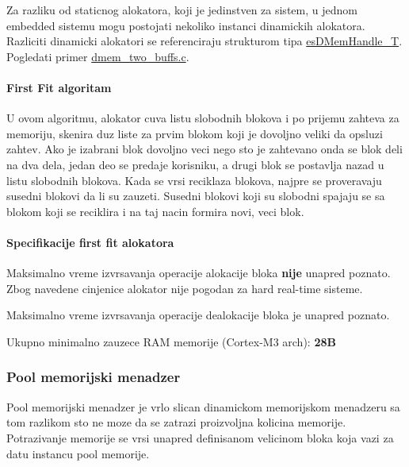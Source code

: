 Za razliku od staticnog alokatora, koji je jedinstven za sistem, u jednom embedded sistemu mogu postojati nekoliko instanci dinamickih alokatora. Razliciti dinamicki alokatori se referenciraju strukturom tipa \hyperlink{group__mem__intf_gacaaf771b18b3da8fa3b67a466390080e}{es\-D\-Mem\-Handle\-\_\-\-T}. Pogledati primer \hyperlink{dmem_two_buffs_8c-example}{dmem\-\_\-two\-\_\-buffs.\-c}.\hypertarget{group__mem_mem_ff_alloc}{}\paragraph{First Fit algoritam}\label{group__mem_mem_ff_alloc}
U ovom algoritmu, alokator cuva listu slobodnih blokova i po prijemu zahteva za memoriju, skenira duz liste za prvim blokom koji je dovoljno veliki da opsluzi zahtev. Ako je izabrani blok dovoljno veci nego sto je zahtevano onda se blok deli na dva dela, jedan deo se predaje korisniku, a drugi blok se postavlja nazad u listu slobodnih blokova. Kada se vrsi reciklaza blokova, najpre se proveravaju susedni blokovi da li su zauzeti. Susedni blokovi koji su slobodni spajaju se sa blokom koji se reciklira i na taj nacin formira novi, veci blok.\hypertarget{group__mem_mem_ff_specs}{}\paragraph{Specifikacije first fit alokatora}\label{group__mem_mem_ff_specs}

\begin{DoxyItemize}
\item Maksimalno vreme izvrsavanja operacije alokacije bloka {\bfseries nije} unapred poznato. Zbog navedene cinjenice alokator nije pogodan za hard real-\/time sisteme.
\item Maksimalno vreme izvrsavanja operacije dealokacije bloka je unapred poznato.
\item Ukupno minimalno zauzece R\-A\-M memorije (Cortex-\/\-M3 arch)\-: {\bfseries 28\-B} 
\end{DoxyItemize}\hypertarget{group__mem_mem_pmem}{}\subsubsection{Pool memorijski menadzer}\label{group__mem_mem_pmem}
Pool memorijski menadzer je vrlo slican dinamickom memorijskom menadzeru sa tom razlikom sto ne moze da se zatrazi proizvoljna kolicina memorije. Potrazivanje memorije se vrsi unapred definisanom velicinom bloka koja vazi za datu instancu pool memorije.


